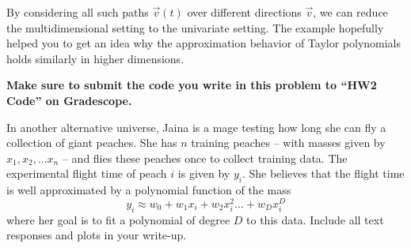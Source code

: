 \documentclass[preview]{standalone}
\begin{document}
\begin{Parts}
By considering all such paths $\vec{v}(t)$ over different directions
$\vec{v}$, we can reduce the multidimensional setting to the  
univariate setting. The example hopefully helped you to get an idea why
the approximation behavior of Taylor polynomials holds similarly
in higher dimensions.











\end{Parts}


\textbf{Make sure to submit the code you write in this problem to ``HW2 Code'' on Gradescope.}

In another alternative universe, Jaina is a mage testing how long she can fly a collection of giant
peaches. She has $n$ training peaches -- with masses given by $x_1, x_2, \ldots x_n$ -- and flies
these peaches once to collect training data. The experimental flight time of peach $i$ is given
by $y_i$. She believes that the flight time is well approximated by a polynomial function of the
mass
\[
y_i \approx w_0 + w_1x_i + w_2x_i^2 \dots + w_Dx_i^D
\]
where her goal is to fit a polynomial of degree $D$ to this data. Include all text responses and
plots in your write-up.
\end{document}
